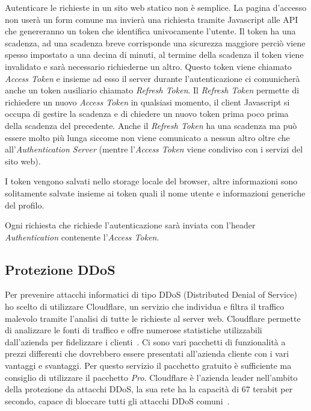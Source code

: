 Autenticare le richieste in un sito web statico non \`e semplice. La pagina d'accesso non user\`a un form comune ma invier\`a una richiesta tramite Javascript alle API che genereranno un token che identifica univocamente l'utente. Il token ha una scadenza, ad una scadenza breve corrisponde una sicurezza maggiore perci\`o viene spesso impostato a una decina di minuti, al termine della scadenza il token viene invalidato e sar\`a necessario richiederne un altro. Questo token viene chiamato \emph{Access Token} e insieme ad esso il server durante l'autenticazione ci comunicher\`a anche un token ausiliario chiamato \emph{Refresh Token}. Il \emph{Refresh Token} permette di richiedere un nuovo \emph{Access Token} in qualsiasi momento, il client Javascript si occupa di gestire la scadenza e di chiedere un nuovo token prima poco prima della scadenza del precedente. Anche il \emph{Refresh Token} ha una scadenza ma pu\`o essere molto pi\`u lunga siccome non viene comunicato a nessun altro oltre che all'\emph{Authentication Server} (mentre l'\emph{Access Token} viene condiviso con i servizi del sito web).

I token vengono salvati nello storage locale del browser, altre informazioni sono solitamente salvate insieme ai token quali il nome utente e informazioni generiche del profilo.

Ogni richiesta che richiede l'autenticazione sar\`a inviata con l'header \emph{Authentication} contenente l'\emph{Access Token}.

\subsection{Protezione DDoS}%
\label{sub:pretezione_ddos}

Per prevenire attacchi informatici di tipo DDoS (Distributed Denial of Service) ho scelto di utilizzare Cloudflare, un servizio che individua e filtra il traffico malevolo tramite l'analisi di tutte le richieste al server web. Cloudflare permette di analizzare le fonti di traffico e offre numerose statistiche utilizzabili dall'azienda per fidelizzare i clienti~\cite{cloudflare-ddos}. Ci sono vari pacchetti di funzionalit\`a a prezzi differenti che dovrebbero essere presentati all'azienda cliente con i vari vantaggi e svantaggi. Per questo servizio il pacchetto gratuito \`e sufficiente ma consiglio di utilizzare il pacchetto \emph{Pro}. Cloudflare \`e l'azienda leader nell'ambito della protezione da attacchi DDoS, la sua rete ha la capacit\`a di 67 terabit per secondo, capace di bloccare tutti gli attacchi DDoS comuni~\cite{cloudflare-research}.

